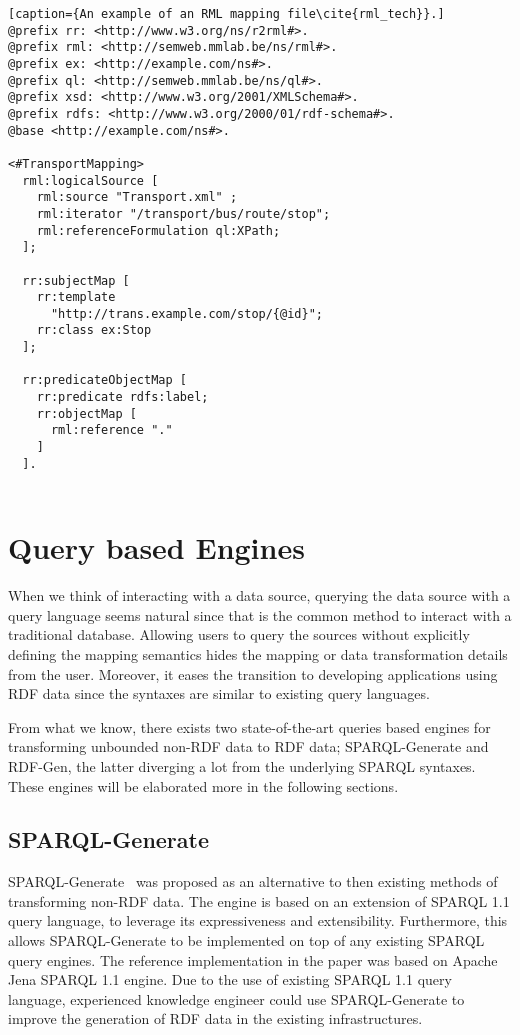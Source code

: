 \begin{lstlisting}[caption={An example of an RML mapping file\cite{rml_tech}}.]
@prefix rr: <http://www.w3.org/ns/r2rml#>.
@prefix rml: <http://semweb.mmlab.be/ns/rml#>.
@prefix ex: <http://example.com/ns#>.
@prefix ql: <http://semweb.mmlab.be/ns/ql#>.
@prefix xsd: <http://www.w3.org/2001/XMLSchema#>.
@prefix rdfs: <http://www.w3.org/2000/01/rdf-schema#>.
@base <http://example.com/ns#>.

<#TransportMapping>
  rml:logicalSource [
    rml:source "Transport.xml" ;
    rml:iterator "/transport/bus/route/stop";
    rml:referenceFormulation ql:XPath;
  ];

  rr:subjectMap [
    rr:template
      "http://trans.example.com/stop/{@id}";
    rr:class ex:Stop
  ];

  rr:predicateObjectMap [
    rr:predicate rdfs:label;
    rr:objectMap [
      rml:reference "."
    ]
  ].
    
\end{lstlisting}

\section{Query based Engines}
\label{sec:query_based_engine}
When we think of interacting with a data source, querying the data source with a 
query language seems natural since that is the common method to interact 
with a traditional database. Allowing users to query the sources without explicitly 
defining the mapping semantics hides the mapping or data transformation details from the user. 
Moreover, it eases the transition to developing applications using RDF data since the syntaxes are 
similar to existing query languages. 

From what we know, there exists two state-of-the-art queries based engines for transforming 
unbounded non-RDF data to RDF data; SPARQL-Generate and RDF-Gen, the latter diverging a lot from
the underlying SPARQL syntaxes.  
These engines will be elaborated more in the following sections. 


\subsection{SPARQL-Generate}
SPARQL-Generate~\cite{sparql_generate} was proposed as an alternative to then existing methods of 
transforming non-RDF data. The engine is based on an extension of SPARQL 1.1 query language, to leverage 
its expressiveness and extensibility. Furthermore, this allows SPARQL-Generate to be implemented on top 
of any existing SPARQL query engines. The reference implementation in the paper was based on Apache Jena 
SPARQL 1.1 engine. Due to the use of existing SPARQL 1.1 query language, experienced knowledge engineer could use 
SPARQL-Generate to improve the generation of RDF data in the existing infrastructures. 

